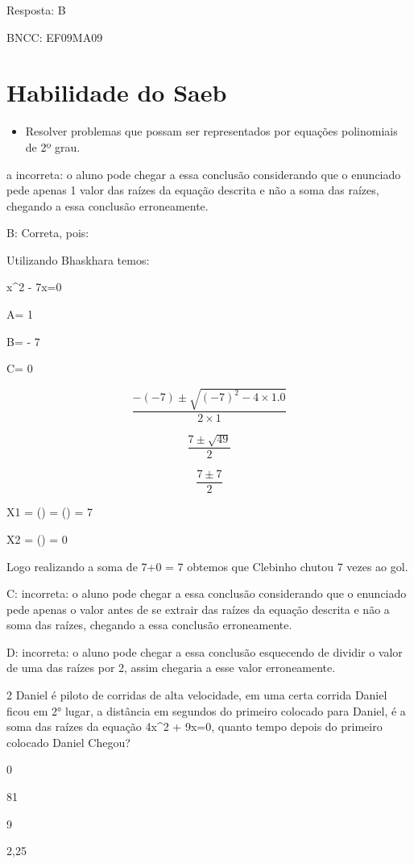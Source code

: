 Resposta: B

BNCC: EF09MA09

\section{Habilidade do Saeb}

\begin{itemize}
\tightlist

\item 
  Resolver problemas que possam ser representados por equações
  polinomiais de 2º grau.
\end{itemize}

a incorreta: o aluno pode chegar a essa conclusão considerando que o
enunciado pede apenas 1 valor das raízes da equação descrita e não a
soma das raízes, chegando a essa conclusão erroneamente.

B: Correta, pois:

Utilizando Bhaskhara temos:

x^2 - 7x=0

A= 1

B= - 7

C= 0

\[\frac{- ( - 7) \pm \sqrt{{( - 7)}^{2} - 4\times 1.0}}{2\times 1}\]

\[\frac{7 \pm \sqrt{49}}{2}\]

\[\frac{7 \pm 7}{2}\]

X1 = () = () = 7

X2 = () = 0

Logo realizando a soma de 7+0 = 7 obtemos que Clebinho chutou 7 vezes ao
gol.

C: incorreta: o aluno pode chegar a essa conclusão considerando que o
enunciado pede apenas o valor antes de se extrair das raízes da equação
descrita e não a soma das raízes, chegando a essa conclusão
erroneamente.

D: incorreta: o aluno pode chegar a essa conclusão esquecendo de dividir
o valor de uma das raízes por 2, assim chegaria a esse valor
erroneamente.

\num{2} Daniel é piloto de corridas de alta velocidade, em uma certa corrida
Daniel ficou em 2° lugar, a distância em segundos do primeiro colocado
para Daniel, é a soma das raízes da equação 4x^2 + 9x=0, quanto tempo
depois do primeiro colocado Daniel Chegou?

\item 0
\item 81
\item 9
\item 2,25

